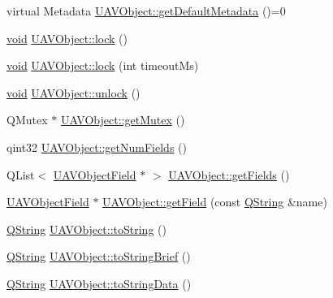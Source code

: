 \begin{DoxyCompactItemize}
\item 
virtual \-Metadata \hyperlink{group___u_a_v_objects_plugin_ga565410bc4fc71be87c359024f6cc8f3c}{\-U\-A\-V\-Object\-::get\-Default\-Metadata} ()=0
\item 
\hyperlink{group___u_a_v_objects_plugin_ga444cf2ff3f0ecbe028adce838d373f5c}{void} \hyperlink{group___u_a_v_objects_plugin_ga02661eea30150b9d24bc3a16423850b8}{\-U\-A\-V\-Object\-::lock} ()
\item 
\hyperlink{group___u_a_v_objects_plugin_ga444cf2ff3f0ecbe028adce838d373f5c}{void} \hyperlink{group___u_a_v_objects_plugin_ga17770eb02bf711b734a041622dccf889}{\-U\-A\-V\-Object\-::lock} (int timeout\-Ms)
\item 
\hyperlink{group___u_a_v_objects_plugin_ga444cf2ff3f0ecbe028adce838d373f5c}{void} \hyperlink{group___u_a_v_objects_plugin_ga2729ba3111341341127946ff1b9bb377}{\-U\-A\-V\-Object\-::unlock} ()
\item 
\-Q\-Mutex $\ast$ \hyperlink{group___u_a_v_objects_plugin_ga07e3fbd0f6a85b23e03afc165456a0ef}{\-U\-A\-V\-Object\-::get\-Mutex} ()
\item 
qint32 \hyperlink{group___u_a_v_objects_plugin_gab9b1f7925306319ea21f599bba0d227f}{\-U\-A\-V\-Object\-::get\-Num\-Fields} ()
\item 
\-Q\-List$<$ \hyperlink{class_u_a_v_object_field}{\-U\-A\-V\-Object\-Field} $\ast$ $>$ \hyperlink{group___u_a_v_objects_plugin_ga043de5085e6ade44abfb005e320d10ca}{\-U\-A\-V\-Object\-::get\-Fields} ()
\item 
\hyperlink{class_u_a_v_object_field}{\-U\-A\-V\-Object\-Field} $\ast$ \hyperlink{group___u_a_v_objects_plugin_ga0c8a0350ce2c49430124b59842fff131}{\-U\-A\-V\-Object\-::get\-Field} (const \hyperlink{group___u_a_v_objects_plugin_gab9d252f49c333c94a72f97ce3105a32d}{\-Q\-String} \&name)
\item 
\hyperlink{group___u_a_v_objects_plugin_gab9d252f49c333c94a72f97ce3105a32d}{\-Q\-String} \hyperlink{group___u_a_v_objects_plugin_ga35168dca4d7a9e25bd117d52a66a2253}{\-U\-A\-V\-Object\-::to\-String} ()
\item 
\hyperlink{group___u_a_v_objects_plugin_gab9d252f49c333c94a72f97ce3105a32d}{\-Q\-String} \hyperlink{group___u_a_v_objects_plugin_gadc4ce5f3b6b9ea7b5d0792bba38cd865}{\-U\-A\-V\-Object\-::to\-String\-Brief} ()
\item 
\hyperlink{group___u_a_v_objects_plugin_gab9d252f49c333c94a72f97ce3105a32d}{\-Q\-String} \hyperlink{group___u_a_v_objects_plugin_gaba674d61ed55f37ab245564c6d05ec72}{\-U\-A\-V\-Object\-::to\-String\-Data} ()
\item 

\end{DoxyCompactItemize}
